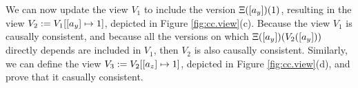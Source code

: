 \begin{example}
% 
We can now update the view $V_1$ to include the version $\Xi([a_y])(1)$, 
resulting in the view $V_2 := V_1[ [a_y] \mapsto 1]$, depicted in Figure \ref{fig:cc.view}(c). 
Because the view $V_1$ is 
causally consistent, and because all the versions on which $\Xi([a_y])(V_2([a_y]))$ directly depends
are included in $V_1$, then $V_2$ is also causally consistent. Similarly, we can define 
the view $V_3 := V_2[[a_z] \mapsto 1]$, depicted in Figure \ref{fig:cc.view}(d), 
and prove that it casually consistent. 


\end{example}

